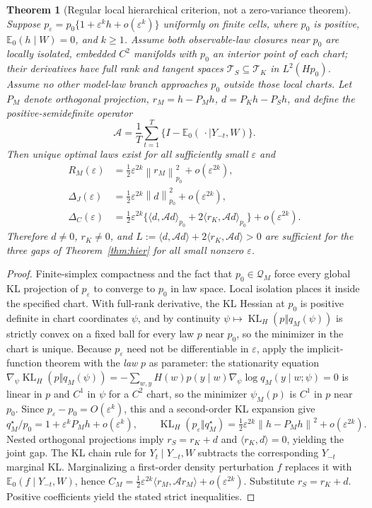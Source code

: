 \documentclass[11pt,letterpaper]{article}
\theoremstyle{plain}
\newtheorem{theorem}{Theorem}[section]
\theoremstyle{definition}
\newcommand{\KL}{\operatorname{KL}}
\newcommand{\E}{\mathbb E}
\newcommand{\norm}[1]{\left\|#1\right\|}
\begin{document}
\begin{theorem}[Regular local hierarchical criterion, not a zero-variance theorem]\label{thm:localhier}
Suppose $p_\varepsilon=p_0\{1+\varepsilon^k h+o(\varepsilon^k)\}$ uniformly on finite cells, where $p_0$ is positive, $\E_0(h\mid W)=0$, and $k\ge1$. Assume both observable-law closures near $p_0$ are locally isolated, embedded $C^2$ manifolds with $p_0$ an \emph{interior} point of each chart; their derivatives have full rank and tangent spaces $\mathcal T_S\subseteq\mathcal T_K$ in $L^2(Hp_0)$. Assume no other model-law branch approaches $p_0$ outside those local charts. Let $P_M$ denote orthogonal projection, $r_M=h-P_Mh$, $d=P_Kh-P_Sh$, and define the positive-semidefinite operator
\[
\mathcal A=\frac1T\sum_{t=1}^T\{I-\E_0(\,\cdot\mid Y_{-t},W)\}.
\]
Then unique optimal laws exist for all sufficiently small $\varepsilon$ and
\begin{align*}
R_M(\varepsilon)&=\tfrac12\varepsilon^{2k}\norm{r_M}_{p_0}^2+o(\varepsilon^{2k}),\\
\Delta_J(\varepsilon)&=\tfrac12\varepsilon^{2k}\norm{d}_{p_0}^2+o(\varepsilon^{2k}),\\
\Delta_C(\varepsilon)&=\tfrac12\varepsilon^{2k}\big\{\langle d,\mathcal A d\rangle_{p_0}+2\langle r_K,\mathcal A d\rangle_{p_0}\big\}+o(\varepsilon^{2k}).
\end{align*}
Therefore $d\ne0$, $r_K\ne0$, and $L:=\langle d,\mathcal A d\rangle+2\langle r_K,\mathcal A d\rangle>0$ are sufficient for the three gaps of Theorem~\ref{thm:hier} for all small nonzero $\varepsilon$.
\end{theorem}
\begin{proof}
Finite-simplex compactness and the fact that $p_0\in\mathcal Q_M$ force every global KL projection of $p_\varepsilon$ to converge to $p_0$ in law space. Local isolation places it inside the specified chart. With full-rank derivative, the KL Hessian at $p_0$ is positive definite in chart coordinates $\psi$, and by continuity $\psi\mapsto\KL_H(p\Vert q_M(\psi))$ is strictly convex on a fixed ball for every law $p$ near $p_0$, so the minimizer in the chart is unique. Because $p_\varepsilon$ need not be differentiable in $\varepsilon$, apply the implicit-function theorem with the \emph{law} $p$ as parameter: the stationarity equation $\nabla_\psi\KL_H(p\Vert q_M(\psi))=-\sum_{w,y}H(w)p(y\mid w)\nabla_\psi\log q_M(y\mid w;\psi)=0$ is linear in $p$ and $C^1$ in $\psi$ for a $C^2$ chart, so the minimizer $\psi_M(p)$ is $C^1$ in $p$ near $p_0$. Since $p_\varepsilon-p_0=O(\varepsilon^k)$, this and a second-order KL expansion give
\[
q_M^\star/p_0=1+\varepsilon^kP_Mh+o(\varepsilon^k),\qquad
\KL_H(p_\varepsilon\Vert q_M^\star)=\tfrac12\varepsilon^{2k}\norm{h-P_Mh}^2+o(\varepsilon^{2k}).
\]
Nested orthogonal projections imply $r_S=r_K+d$ and $\langle r_K,d\rangle=0$, yielding the joint gap. The KL chain rule for $Y_t\mid Y_{-t},W$ subtracts the corresponding $Y_{-t}$ marginal KL. Marginalizing a first-order density perturbation $f$ replaces it with $\E_0(f\mid Y_{-t},W)$, hence $C_M=\frac12\varepsilon^{2k}\langle r_M,\mathcal A r_M\rangle+o(\varepsilon^{2k})$. Substitute $r_S=r_K+d$. Positive coefficients yield the stated strict inequalities.
\end{proof}
\end{document}

